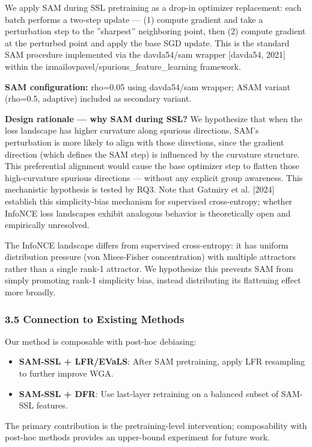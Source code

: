 We apply SAM during SSL pretraining as a drop-in optimizer replacement: each batch performs a two-step update --- (1) compute gradient and take a perturbation step to the ''sharpest'' neighboring point, then (2) compute gradient at the perturbed point and apply the base SGD update. This is the standard SAM procedure implemented via the davda54/sam wrapper [davda54, 2021] within the izmailovpavel/spurious\_feature\_learning framework.

\textbf{SAM configuration:} rho=0.05 using davda54/sam wrapper; ASAM variant (rho=0.5, adaptive) included as secondary variant.

\textbf{Design rationale --- why SAM during SSL?} We hypothesize that when the loss landscape has higher curvature along spurious directions, SAM's perturbation is more likely to align with those directions, since the gradient direction (which defines the SAM step) is influenced by the curvature structure. This preferential alignment would cause the base optimizer step to flatten those high-curvature spurious directions --- without any explicit group awareness. This mechanistic hypothesis is tested by RQ3. Note that Gatmiry et al. [2024] establish this simplicity-bias mechanism for supervised cross-entropy; whether InfoNCE loss landscapes exhibit analogous behavior is theoretically open and empirically unresolved.

The InfoNCE landscape differs from supervised cross-entropy: it has uniform distribution pressure (von Mises-Fisher concentration) with multiple attractors rather than a single rank-1 attractor. We hypothesize this prevents SAM from simply promoting rank-1 simplicity bias, instead distributing its flattening effect more broadly.

\subsubsection{3.5 Connection to Existing Methods}

Our method is composable with post-hoc debiasing:
\begin{itemize}
\item \textbf{SAM-SSL + LFR/EVaLS}: After SAM pretraining, apply LFR resampling to further improve WGA.
\item \textbf{SAM-SSL + DFR}: Use last-layer retraining on a balanced subset of SAM-SSL features.
\end{itemize}

The primary contribution is the pretraining-level intervention; composability with post-hoc methods provides an upper-bound experiment for future work.

